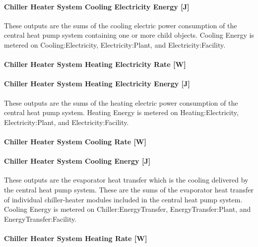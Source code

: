 \paragraph{Chiller Heater System Cooling Electricity Energy {[}J{]}}\label{chiller-heater-system-cooling-electric-energy-j}

These outputs are the sums of the cooling electric power consumption of the central heat pump system containing one or more child objects. Cooling Energy is metered on Cooling:Electricity, Electricity:Plant, and Electricity:Facility.

\paragraph{Chiller Heater System Heating Electricity Rate {[}W{]}}\label{chiller-heater-system-heating-electric-power-w}

\paragraph{Chiller Heater System Heating Electricity Energy {[}J{]}}\label{chiller-heater-system-heating-electric-energy-j}

These outputs are the sums of the heating electric power consumption of the central heat pump system. Heating Energy is metered on Heating:Electricity, Electricity:Plant, and Electricity:Facility.

\paragraph{Chiller Heater System Cooling Rate {[}W{]}}\label{chiller-heater-system-cooling-rate-w}

\paragraph{Chiller Heater System Cooling Energy {[}J{]}}\label{chiller-heater-system-cooling-energy-j}

These outputs are the evaporator heat transfer which is the cooling delivered by the central heat pump system. These are the sums of the evaporator heat transfer of individual chiller-heater modules included in the central heat pump system. Cooling Energy is metered on Chiller:EnergyTransfer, EnergyTransfer:Plant, and EnergyTransfer:Facility.

\paragraph{Chiller Heater System Heating Rate {[}W{]}}\label{chiller-heater-system-heating-rate-w}

